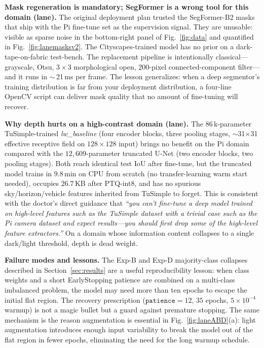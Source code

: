 \documentclass[conference]{IEEEtran}
\begin{document}
\textbf{Mask regeneration is mandatory; SegFormer is a wrong tool
for this domain (lane).}
The original deployment plan trusted the SegFormer-B2 masks
\cite{segformer} that ship with the Pi fine-tune set as the
supervision signal. They are unusable: visible as sparse noise in
the bottom-right panel of Fig.~\ref{fig:data} and quantified in
Fig.~\ref{fig:lanemasksv2}. The Cityscapes-trained model has no
prior on a dark-tape-on-fabric test-bench. The replacement pipeline
is intentionally classical---grayscale, Otsu, $3\!\times\!3$
morphological open, $200$-pixel connected-component filter---and it
runs in $\sim$\,21\,ms per frame. The lesson generalizes: when a
deep segmentor's training distribution is far from your deployment
distribution, a four-line OpenCV script can deliver mask quality
that no amount of fine-tuning will recover.

\textbf{Why depth hurts on a high-contrast domain (lane).}
The $86$\,k-parameter TuSimple-trained \textit{lw\_baseline} (four
encoder blocks, three pooling stages, $\sim$31$\times$31 effective
receptive field on $128\!\times\!128$ input) brings no benefit on
the Pi domain compared with the $12{,}609$-parameter truncated
U-Net (two encoder blocks, two pooling stages). Both reach
identical test IoU after fine-tune, but the truncated model
trains in $9.8$\,min on CPU from scratch (no transfer-learning
warm start needed), occupies $26.7$\,KB after PTQ-int8, and has no
spurious sky/horizon/vehicle features inherited from TuSimple to
forget. This is consistent with the doctor's direct guidance that
\emph{``you can't fine-tune a deep model trained on high-level
features such as the TuSimple dataset with a trivial case such as
the Pi camera dataset and expect results---you should first drop
some of the high-level feature extractors.''} On a domain whose
information content collapses to a single dark/light threshold,
depth is dead weight.

\textbf{Failure modes and lessons.}
The Exp-B and Exp-D majority-class collapses described in
Section~\ref{sec:results} are a useful reproducibility lesson: when
class weights and a short EarlyStopping patience are combined on a
multi-class imbalanced problem, the model may need more than ten
epochs to escape the initial flat region. The recovery prescription
($\texttt{patience}=12$, $35$ epochs, $5\!\times\!10^{-4}$ warmup) is
not a magic bullet but a guard against premature stopping. The same
mechanism is the reason augmentation is essential in
Fig.~\ref{fig:laneABD}(a): light augmentation introduces enough
input variability to break the model out of the flat region in fewer
epochs, eliminating the need for the long warmup schedule.
\end{document}
